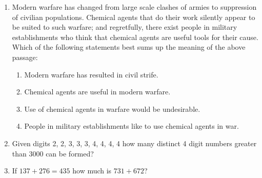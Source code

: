 \documentclass[12pt]{article}
\theoremstyle{remark}
\begin{document}
\begin{enumerate}
\item Modern warfare has changed from large scale clashes of armies to suppression of civilian populations. Chemical agents that do their work silently appear to be suited to such warfare; and regretfully, there exist people in military establishments who think that chemical agents are useful tools for their cause.
Which of the following statements best sums up the meaning of the above passage:
\begin{enumerate}
    \item Modern warfare has resulted in civil strife.
    \item Chemical agents are useful in modern warfare.
    \item Use of chemical agents in warfare would be undesirable.
    \item People in military establishments like to use chemical agents in war.
\end{enumerate}
\hfill{}

\item Given digits 2, 2, 3, 3, 3, 4, 4, 4, 4 how many distinct 4 digit numbers greater than 3000 can be formed?
\begin{enumerate}
\end{enumerate}
\hfill{}

\item If $137+276=435$ how much is $731+672$?
\begin{enumerate}
\end{enumerate}
\hfill{}

\end{enumerate}
\end{document}
